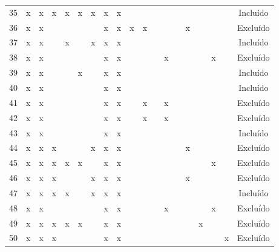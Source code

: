 \documentclass[
	12pt,				%
	oneside,			%
	a4paper,			%
	english,			%
	brazil				%
	]{abntex2ppgsi}
\begin{document}
\begin{apendicesenv}
\begin{table}[H]
\begin{tabular}{c | c c c c c c c c | c c c c c c c c c | c}
35 & x & x & x & x & x & x & x & x &   &   &   &   &   &   &   &   &   & Incluído \\
36 & x & x &   &   &   &   & x & x & x & x &   &   &   & x &   &   &   & Excluído \\
37 & x & x &   & x &   & x & x & x &   &   &   &   &   &   &   &   &   & Incluído \\
38 & x & x &   &   &   &   & x & x &   &   &   & x &   &   &   & x &   & Excluído \\
39 & x & x &   &   & x &   & x & x &   &   &   &   &   &   &   &   &   & Incluído \\
40 & x & x &   &   &   &   & x & x &   &   &   &   &   &   &   &   &   & Incluído \\
41 & x & x &   &   &   &   & x & x &   & x &   & x &   &   &   &   &   & Excluído \\
42 & x & x &   &   &   &   & x & x &   & x &   & x &   &   &   &   &   & Excluído \\
43 & x & x &   &   &   &   & x & x &   &   &   &   &   &   &   &   &   & Incluído \\
44 & x & x & x &   &   & x & x & x &   &   &   &   &   & x &   &   &   & Excluído \\
45 & x & x & x & x & x &   & x & x &   &   &   &   &   &   &   & x &   & Excluído \\
46 & x & x & x &   &   & x & x & x &   &   &   &   &   & x &   &   &   & Excluído \\
47 & x & x & x & x &   & x & x & x &   &   &   &   &   &   &   &   &   & Incluído \\
48 & x & x &   &   &   &   & x & x &   &   &   & x &   &   &   & x &   & Excluído \\
49 & x & x & x & x & x &   & x & x &   &   &   &   &   &   & x &   &   & Excluído \\
50 & x & x & x &   &   &   & x & x &   &   &   &   &   &   &   &   & x & Excluído \\
\bottomrule
\end{tabular}
\end{table}



\end{apendicesenv}
\end{document}
